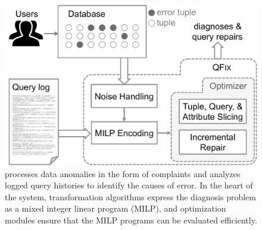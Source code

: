
\begin{figure}[t]
    \centering
        \includegraphics[scale=0.35]{figures/architecture}
    \caption{\sys processes data anomalies in the form of complaints and analyzes logged query histories to identify the causes of error. In the heart of the system, transformation algorithms express the diagnosis problem as a mixed integer linear program (MILP), and optimization modules ensure that the MILP programs can be evaluated efficiently.}
    \label{fig:architecture}
\end{figure}

